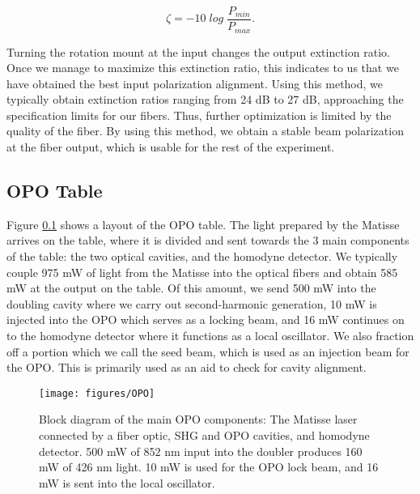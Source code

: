 \begin{equation}
  \label{eq:extinction_ratio}
  \zeta = -10 \; log \; \frac{P_{min}}{P_{max}}   .
\end{equation}

Turning the rotation mount at the input changes the output extinction ratio.  Once we manage to maximize this extinction ratio, this indicates to us that we have obtained the best input polarization alignment.  Using this method, we typically obtain extinction ratios ranging from 24 dB to 27 dB, approaching the specification limits for our fibers.  Thus, further optimization is limited by the quality of the fiber.  By using this method, we obtain a stable beam polarization at the fiber output, which is usable for the rest of the experiment.






\subsection{OPO Table} 
\label{opo_table}


Figure \ref{opo_table} shows a layout of the OPO table.  The light prepared by the Matisse arrives on the table, where it is divided and sent towards the 3 main components of the table: the two optical cavities, and the homodyne detector.  We typically couple 975 mW of light from the Matisse into the optical fibers and obtain 585 mW at the output on the table.  Of this amount, we send 500 mW into the doubling cavity where we carry out second-harmonic generation, 10 mW is injected into the OPO which serves as a locking beam, and 16 mW continues on to the homodyne detector where it functions as a local oscillator.  We also fraction off a portion which we call the seed beam, which is used as an injection beam for the OPO.  This is primarily used as an aid to check for cavity alignment.

\begin{figure}[ht] 
 \centering 
 \texttt{[image: figures/OPO]} 
 \caption[OPO table block diagram]{Block diagram of the main OPO components: The Matisse laser connected by a fiber optic, SHG and OPO cavities, and homodyne detector.  500 mW of 852 nm input into the doubler produces 160 mW of 426 nm light.  10 mW is used for the OPO lock beam, and 16 mW is sent into the local oscillator.}
 \label{fig:opo_table} 
\end{figure}

